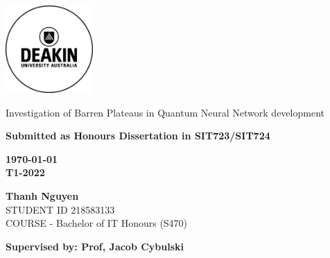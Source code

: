 \thispagestyle{empty}
\begin{titlepage}
    \includegraphics[width=0.25\textwidth]{src/CoverPage/Deakin_Logo.jpeg}
        \begin{center}
        \vspace*{4cm}
        {\LARGE Investigation of Barren Plateaus in Quantum Neural Network development}
        \vspace{3cm}
            \begin{large}   
    
        
            \bf Submitted as Honours Dissertation in SIT723/SIT724
            \vspace{1cm}
        
            \bf \today \\
            T1-2022        
        
            \vspace{3cm}
            \textbf{Thanh Nguyen}\\
            STUDENT ID 218583133 \\
            COURSE - Bachelor of IT Honours (S470)
            \vfill

            \bf \normalsize Supervised by: Prof, Jacob Cybulski\\
       
        \end{large}  
   \end{center}
\end{titlepage}
